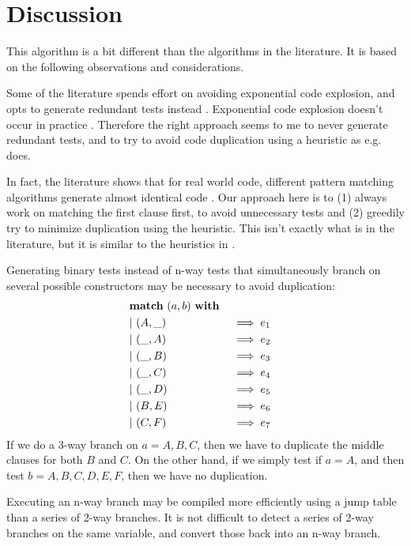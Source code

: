 \documentclass[a4paper, 11pt]{article}
\theoremstyle{definition}
\begin{document}
\section{Discussion}

This algorithm is a bit different than the algorithms in the literature. It is based on the following observations and considerations.

Some of the literature spends effort on avoiding exponential code explosion, and opts to generate redundant tests instead \cite{augustsson_compiling_1985}. Exponential code explosion doesn't occur in practice \cite{scott_when_2000}. Therefore the right approach seems to me to never generate redundant tests, and to try to avoid code duplication using a heuristic as e.g. \cite{maranget_compiling_2008} does.

In fact, the literature shows that for real world code, different pattern matching algorithms generate almost identical code \cite{scott_when_2000,maranget_compiling_2008}. Our approach here is to (1) always work on matching the first clause first, to avoid unnecessary tests and (2) greedily try to minimize duplication using the heuristic. This isn't exactly what is in the literature, but it is similar to the heuristics in \cite{maranget_compiling_2008}.

Generating binary tests instead of n-way tests that simultaneously branch on several possible constructors may be necessary to avoid duplication:
\begin{alignat*}{4}
  &\mathbf{match}\ (a,b)\ \mathbf{with} \\
  &\mathbf{\mid}\ (A,\_)\quad &&\implies e_1 & \\
  &\mathbf{\mid}\ (\_,A)\quad &&\implies e_2 & \\
  &\mathbf{\mid}\ (\_,B)\quad &&\implies e_3 & \\
  &\mathbf{\mid}\ (\_,C)\quad &&\implies e_4 & \\
  &\mathbf{\mid}\ (\_,D)\quad &&\implies e_5 & \\
  &\mathbf{\mid}\ (B,E)\quad &&\implies e_6 & \\
  &\mathbf{\mid}\ (C,F)\quad &&\implies e_7 &
\end{alignat*}
If we do a 3-way branch on $a=A,B,C$, then we have to duplicate the middle clauses for both $B$ and $C$. On the other hand, if we simply test if $a=A$, and then test $b=A,B,C,D,E,F$, then we have no duplication.

Executing an n-way branch may be compiled more efficiently using a jump table than a series of 2-way branches. It is not difficult to detect a series of 2-way branches on the same variable, and convert those back into an n-way branch.
\end{document}
